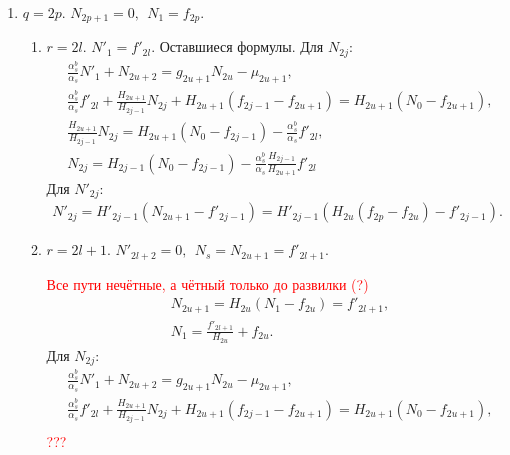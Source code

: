 \begin{enumerate}
    \begin{enumerate}
        \item \(q=2p\). \(N_{2p+1} = 0, ~~ N_1 = f_{2p}\).
        \begin{enumerate}
            \item \(r=2l\). \(N'_1 = f'_{2l}\). Оставшиеся формулы. Для \(N_{2j}\):
            \begin{equation*}
                \begin{split}
                    & \frac{\alpha^b_s}{\alpha_s} N'_1 + N_{2u+2} = g_{2u+1} N_{2u} - \mu_{2u+1}, \\
                    & \frac{\alpha^b_s}{\alpha_s} f'_{2l} + \frac{H_{2u+1}}{H_{2j-1}} N_{2j} + H_{2u+1} (f_{2j-1} - f_{2u+1}) = H_{2u+1} (N_0 - f_{2u+1}), \\
                    & \frac{H_{2u+1}}{H_{2j-1}} N_{2j} = H_{2u+1} (N_0 - f_{2j-1}) - \frac{\alpha^b_s}{\alpha_s} f'_{2l}, \\
                    & N_{2j} = H_{2j-1} (N_0 - f_{2j-1}) - \frac{\alpha^b_s}{\alpha_s} \frac{H_{2j-1}}{H_{2u+1}} f'_{2l}
                \end{split}
            \end{equation*}
            Для \(N'_{2j}\):
            \begin{equation*}
                \begin{split}
                    N'_{2j} = H'_{2j-1} (N_{2u+1} - f'_{2j-1}) = H'_{2j-1} ( H_{2u} (f_{2p} - f_{2u}) - f'_{2j-1}).
                \end{split}
            \end{equation*}

            \item \(r=2l+1\). \(N'_{2l+2} = 0, ~~ N_s = N_{2u+1} = f'_{2l+1} \).
            
            \textcolor{red}{Все пути нечётные, а чётный только до развилки (?)}
            \begin{equation*}
                \begin{split}
                    & N_{2u+1} = H_{2u} (N_1 - f_{2u}) = f'_{2l+1}, \\
                    & N_1 = \frac{f'_{2l+1}}{H_{2u}} + f_{2u}.
                \end{split}
            \end{equation*}
            Для \(N_{2j}\):
            \begin{equation*}
                \begin{split}
                    & \frac{\alpha^b_s}{\alpha_s} N'_1 + N_{2u+2} = g_{2u+1} N_{2u} - \mu_{2u+1}, \\
                    & \frac{\alpha^b_s}{\alpha_s} f'_{2l} + \frac{H_{2u+1}}{H_{2j-1}} N_{2j} + H_{2u+1} (f_{2j-1} - f_{2u+1}) = H_{2u+1} (N_0 - f_{2u+1}), \\
                \end{split}
            \end{equation*}
            \textcolor{red}{???}
        \end{enumerate} %


\end{enumerate}
\end{enumerate}
